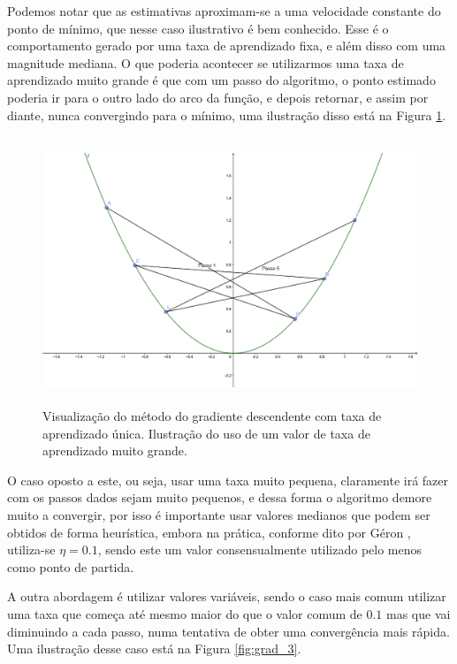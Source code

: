 Podemos notar que as estimativas aproximam-se a uma velocidade constante do ponto de mínimo, que nesse caso ilustrativo é bem conhecido. Esse é o comportamento gerado por uma taxa de aprendizado fixa, e além disso com uma magnitude mediana. O que poderia acontecer se utilizarmos uma taxa de aprendizado muito grande é que com um passo do algoritmo, o ponto estimado poderia ir para o outro lado do arco da função, e depois retornar, e assim por diante, nunca convergindo para o mínimo, uma ilustração disso está na Figura \ref{fig:grad_2}.

\begin{figure}[htb]
\centering
\includegraphics[height=8cm]{figuras/grad_2}
\caption{Visualização do método do gradiente descendente com taxa de aprendizado única. Ilustração do uso de um valor de taxa de aprendizado muito grande.}
\label{fig:grad_2}
\end{figure}

O caso oposto a este, ou seja, usar uma taxa muito pequena, claramente irá fazer com os passos dados sejam muito pequenos, e dessa forma o algoritmo demore muito a convergir, por isso é importante usar valores medianos que podem ser obtidos de forma heurística, embora na prática, conforme dito por Géron \citep{hands}, utiliza-se $\eta = 0.1$, sendo este um valor consensualmente utilizado pelo menos como ponto de partida.

A outra abordagem é utilizar valores variáveis, sendo o caso mais comum utilizar uma taxa que começa até mesmo maior do que o valor comum de $0.1$ mas que vai diminuindo a cada passo, numa tentativa de obter uma convergência mais rápida. Uma ilustração desse caso está na Figura \ref{fig:grad_3}.


